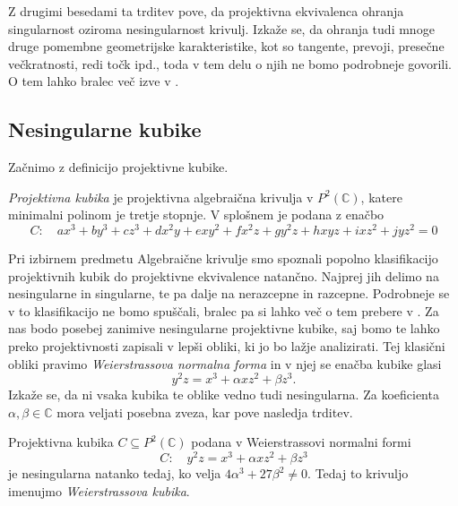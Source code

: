 \documentclass[mat1]{fmfdelo}
\newcommand{\C}{\mathbb C}
\newcommand{\PC}{P^2(\mathbb C)}
\theoremstyle{definition}
\begin{document}
Z drugimi besedami ta trditev pove, da projektivna ekvivalenca ohranja singularnost oziroma nesingularnost krivulj. Izkaže se, da ohranja tudi mnoge druge pomembne geometrijske karakteristike, kot so tangente, prevoji, presečne večkratnosti, redi točk ipd., toda v tem delu o njih ne bomo podrobneje govorili. O tem lahko bralec več izve v \cite{Gibson}.



\subsection{Nesingularne kubike}\label{nesingularne kubike}
Začnimo z definicijo projektivne kubike. 

\begin{definicija}
    \emph{Projektivna kubika} je projektivna algebraična krivulja v $\PC$, katere minimalni polinom je tretje stopnje. 
    V splošnem je podana z enačbo
    \[
        C: \quad ax^3 + by^3 + cz^3 + dx^2y + exy^2 + fx^2z + gy^2z + hxyz + ixz^2 + jyz^2 = 0
    \]
\end{definicija}

Pri izbirnem predmetu Algebraične krivulje smo spoznali popolno klasifikacijo projektivnih kubik do projektivne ekvivalence natančno. Najprej jih delimo na nesingularne in singularne, te pa dalje na nerazcepne in razcepne. Podrobneje se v to klasifikacijo ne bomo spuščali, bralec pa si lahko več o tem prebere v \cite[poglavje 15]{Gibson}.
Za nas bodo posebej zanimive nesingularne projektivne kubike, saj bomo te lahko preko projektivnosti zapisali v lepši obliki, ki jo bo lažje analizirati. Tej klasični obliki pravimo \emph{Weierstrassova normalna forma} in v njej se enačba kubike glasi 
\begin{equation}
    \label{klasicna wnf}
    y^2z = x^3 + \alpha xz^2 + \beta z^3. 
\end{equation}
Izkaže se, da ni vsaka kubika te oblike vedno tudi nesingularna. Za koeficienta $\alpha, \beta \in \C$ mora veljati posebna zveza, kar pove nasledja trditev.

\begin{trditev}
    \label{kriterij za singularnost wnf}
    Projektivna kubika $C \subseteq \PC$ podana v Weierstrassovi normalni formi
    \[
        C: \quad y^2z = x^3 + \alpha xz^2 + \beta z^3
    \]
    je nesingularna natanko tedaj, ko velja $4\alpha^3 + 27\beta^2 \neq 0$. Tedaj to krivuljo imenujmo \emph{Weierstrassova kubika}. 

\end{trditev}
\end{document}

